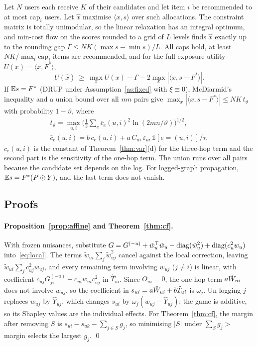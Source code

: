 \begin{theorem}\label{thm:alloc}
Let $N$ users each receive $K$ of their candidates and let item $i$ be
recommended to at most $\mathrm{cap}_i$ users. Let $\hat x$ maximise $\langle x,s\rangle$
over such allocations. The constraint matrix is totally unimodular, so the
linear relaxation has an integral optimum, and min-cost flow on the scores
rounded to a grid of $L$ levels finds $\hat x$ exactly up to the rounding gap
$\Gamma\le NK(\max s-\min s)/L$. All caps hold, at least $NK/\max_i\mathrm{cap}_i$
items are recommended, and for the full-exposure utility $U(x)=\langle x,F^*\rangle$,
\[
U(\hat x)\ \ge\ \max_{x}U(x)-\Gamma-2\max_x|\langle x,s-F^*\rangle| .
\]
If $\mathbb{E} s=F^*$ (DRUP under Assumption~\ref{as:fixed} with $\xi\equiv0$),
McDiarmid's inequality and a union bound over all $mn$ pairs give
$\max_x|\langle x,s-F^*\rangle|\le NK\,t_\vartheta$ with probability $1-\vartheta$, where
\begin{gather*}
t_\vartheta=\max_{u,i}\Big(\tfrac12\textstyle\sum_e\bar c_e(u,i)^2\ln(2mn/\vartheta)\Big)^{1/2},\\
\bar c_e(u,i)=b\,c_e(u,i)+a\,C_{ui}\,\varepsilon_{ui}\,\mathbb 1[e=(u,i)]/\tau ,
\end{gather*}
$c_e(u,i)$ is the constant of Theorem~\ref{thm:var}(d) for the three-hop term
and the second part is the sensitivity of the one-hop term. The union runs over
all pairs because the candidate set depends on the log. For logged-graph propagation,
$\mathbb{E} s=F^*(P\odot Y)$, and the last term does not vanish.
\end{theorem}

\subsection{Proofs}\label{sec:structproofs}

\paragraph{Proposition~\ref{prop:affine} and Theorem~\ref{thm:cf}.}
With frozen nuisances, substitute
$G=G^{(-u)}+\tilde w_u^\top\tilde w_u-\operatorname{diag}(\tilde w_u^2)+\operatorname{diag}(c_u^2w_u)$
into~\eqref{eq:local}. The terms $\tilde w_{ui}\sum_j\tilde w_{uj}^2$ cancel against the
local correction, leaving $\tilde w_{ui}\sum_jc_{uj}^2w_{uj}$, and every remaining term
involving $w_{uj}$ ($j\neq i$) is linear, with coefficient
$c_{uj}G^{(-u)}_{ji}+c_{ui}w_{ui}c_{uj}^2$ in $\hat T_{ui}$. Since $O_{ui}=0$, the one-hop
term $a\tilde W_{ui}$ does not involve $w_{uj}$, so the coefficient in $s_{ui}=a\tilde W_{ui}+b\hat T_{ui}$
is $\omega_j$. Un-logging $j$ replaces $w_{uj}$ by
$\hat Y_{uj}$, which changes $s_{ui}$ by $\omega_j(w_{uj}-\hat Y_{uj})$; the game is additive, so
its Shapley values are the individual effects. For Theorem~\ref{thm:cf}, the
margin after removing $S$ is $s_{ui}-s_{uk}-\sum_{j\in S}g_j$, so minimising $|S|$
under $\sum_Sg_j>$ margin selects the largest $g_j$. \qed

